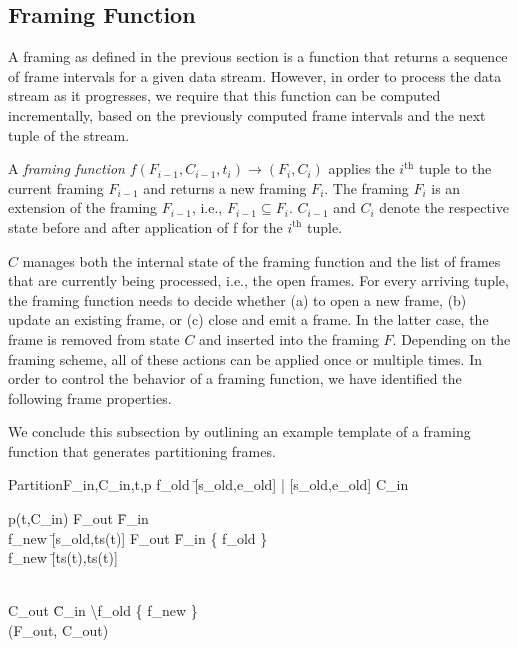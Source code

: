 \documentclass{vldb}
\begin{document}
\subsection{Framing Function}

A framing as defined in the previous section is a function that returns a sequence of frame intervals for a given data stream. However, in order to process the data stream as it progresses, we require that this function can be computed incrementally, based on the previously computed frame intervals and the next tuple of the stream.

\begin{definition}
A \emph{framing function} $f(F_{i-1}, C_{i-1}, t_i ) \rightarrow (F_i, C_i)$ applies the $i^\text{th}$ tuple to the current framing $F_{i-1}$ and returns a new framing $F_i$. The framing $F_i$ is an extension of the framing $F_{i-1}$, i.e., $F_{i-1} \subseteq F_i$. $C_{i-1}$ and $C_i$ denote the respective state before and after application of f for the $i^\text{th}$ tuple.
\end{definition}

$C$ manages both the internal state of the framing function and the list of frames that are currently being processed, i.e., the open frames. For every arriving tuple, the framing function needs to decide whether (a) to open a new frame, (b) update an existing frame, or (c) close and emit a frame. In the latter case, the frame is removed from state $C$ and inserted into the framing $F$. Depending on the framing scheme, all of these actions can be applied once or multiple times. In order to control the behavior of a framing function, we have identified the following frame properties.

We conclude this subsection by outlining an example template of a framing function that generates partitioning frames.\\

\begin{algorithm}{Partition}{F_{in},C_{in},t,p} %
   f_{old} \= [s_{old},e_{old}] | [s_{old},e_{old}] \in C_{in} \\
   \begin{IF}{p(t,C_{in})}
      F_{out} \= F_{in} \\
      f_{new} \= [s_{old},ts(t)]
   \ELSE
      F_{out} \= F_{in} \cup \{ f_{old} \} \\
      f_{new} \= [ts(t),ts(t)]
   \end{IF}\\
   C_{out} \= C_{in} \backslash f_{old} \cup \{ f_{new} \} \\
   \RETURN (F_{out}, C_{out})
\end{algorithm}
\end{document}
